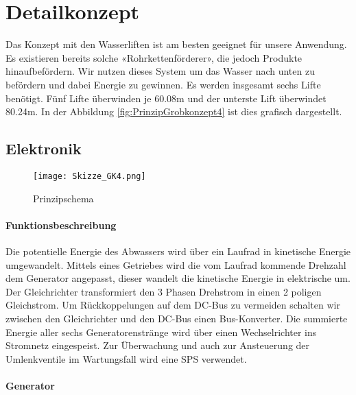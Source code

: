 \section{Detailkonzept} \label{sec:detailkonzept}

Das Konzept mit den Wasserliften ist am besten geeignet für unsere Anwendung. Es existieren bereits solche «Rohrkettenförderer», die jedoch Produkte hinaufbefördern. Wir nutzen dieses System um das Wasser nach unten zu befördern und dabei Energie zu gewinnen. Es werden insgesamt sechs Lifte benötigt. Fünf Lifte überwinden je 60.08\si{m} und der unterste Lift überwindet 80.24\si{m}. In der Abbildung \ref{fig:PrinzipGrobkonzept4}  ist dies grafisch dargestellt.

\subsection{Elektronik}

\begin{figure}[H]
\centering
\texttt{[image: Skizze\_GK4.png]}
\caption{Prinzipschema}
\label{fig:Prinzipschema}
\end{figure}

\paragraph{Funktionsbeschreibung}
Die potentielle Energie des Abwassers wird über ein Laufrad in kinetische Energie umgewandelt. Mittels eines Getriebes wird die vom Laufrad kommende Drehzahl dem Generator angepasst, dieser wandelt die kinetische Energie in elektrische um. Der Gleichrichter transformiert den 3 Phasen Drehstrom in einen 2 poligen Gleichstrom. Um Rückkoppelungen auf dem DC-Bus zu vermeiden schalten wir zwischen den Gleichrichter und den DC-Bus einen Bus-Konverter. Die summierte Energie aller sechs Generatorenstränge wird über einen Wechselrichter ins Stromnetz eingespeist.
Zur Überwachung und auch zur Ansteuerung der Umlenkventile im Wartungsfall wird eine SPS verwendet.



\paragraph{Generator}


